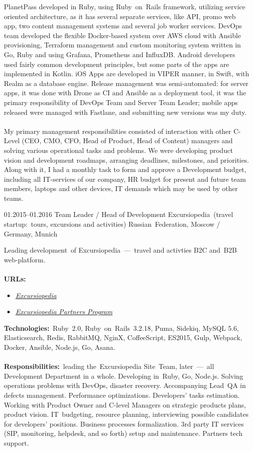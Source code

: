 \documentclass[12pt,a4paper,final]{moderncv}
\begin{document}
{  PlanetPass developed in Ruby, using Ruby~on~Rails framework, utilizing service oriented architecture, as it has several separate services, like API, promo web app, two content management systems and several job worker services. DevOps team developed the flexible Docker-based system over AWS cloud with Ansible provisioning, Terraform management and custom monitoring system written in Go, Ruby and using Grafana, Prometheus and InfluxDB. Android developers used fairly common development principles, but some parts of the apps are implemented in Kotlin. iOS Apps are developed in VIPER manner, in Swift, with Realm as a database engine. Release management was semi-automated: for server apps, it was done with Drone as CI and Ansible as a deployment tool, it was the primary responsibility of DevOps Team and Server Team Leader; mobile apps released were managed with Fastlane, and submitting new versions was my duty.
  \\\\
  My primary management responsibilities consisted of interaction with other C-Level (CEO, CMO, CFO, Head of Product, Head of Content) managers and solving various operational tasks and problems. We were developing product vision and development roadmaps, arranging deadlines, milestones, and priorities. Along with it, I had a monthly task to form and approve a Development budget, including all IT-services of our company, HR budget for present and future team members, laptops and other devices, IT demands which may be used by other teams.
}

\cventry
{01.2015--01.2016}
{Team Leader / Head of Development}
{Excursiopedia~(travel startup:~tours, excursions and activities)}
{Russian~Federation, Moscow / Germany, Munich}
{}
{
  Leading development~of Excursiopedia~---~travel and activties B2C and~B2B web-platform.
  \\\\
  \textbf{URLs:}
  \begin{itemize}
    \item \underline{\href{https://www.excursiopedia.com}{\itshape Excursiopedia}}
    \item \underline{\href{https://partners.excursiopedia.com}{\itshape Excursiopedia Partners Program}}
  \end{itemize}
  \bigskip
  \textbf{Technologies:}~Ruby~2.0, Ruby~on~Rails~3.2.18, Puma, Sidekiq, MySQL 5.6, Elasticsearch, Redis, RabbitMQ, NginX, CoffeeScript, ES2015, Gulp, Webpack, Docker, Ansible, Node.js, Go, Asana.
  \\\\
  \textbf{Responsibilities:}~leading the~Excursiopedia Site~Team, later~---~all Development Department in a whole. Developing in~Ruby, Go, Node.js. Solving operations problems with DevOps, disaster recovery. Accompanying Lead~QA in defects management. Performance optimizations. Developers' tasks estimation. Working with Product Owner and C-level Managers on strategic products plans, product vision. IT~budgeting, resource planning, interviewing possible candidates for developers' positions. Business processes formalization. 3rd party IT services (SIP, monitoring, helpdesk, and so forth) setup and maintenance. Partners tech support.
}
\end{document}
